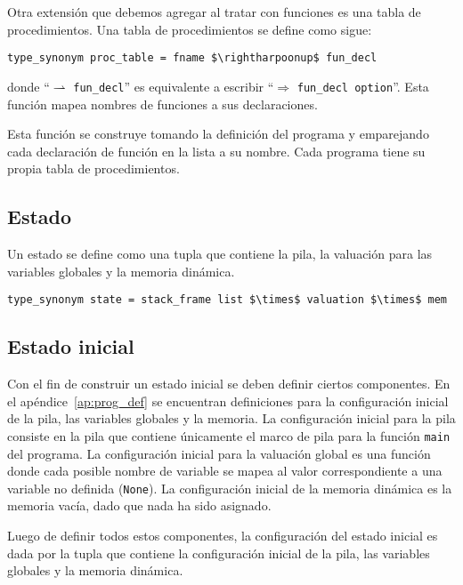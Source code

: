 Otra extensión que debemos agregar al tratar con funciones es una tabla de procedimientos.
Una tabla de procedimientos se define como sigue:

\begin{lstlisting}[mathescape=true, frame=single]
type_synonym proc_table = fname $\rightharpoonup$ fun_decl
\end{lstlisting}

donde ``$\rightharpoonup$ \verb|fun_decl|'' es equivalente a escribir ``$\Rightarrow$ \verb|fun_decl option|''.
Esta función mapea nombres de funciones a sus declaraciones.

Esta función se construye tomando la definición del programa y emparejando cada declaración de función en la lista a su nombre.
Cada programa tiene su propia tabla de procedimientos.


\subsection{Estado}\label{subsection:state}

Un estado se define como una tupla que contiene la pila, la valuación para las variables globales y la memoria dinámica.

\begin{lstlisting}[mathescape=true, frame=single]
type_synonym state = stack_frame list $\times$ valuation $\times$ mem
\end{lstlisting}

\subsection{Estado inicial}\label{subsection:initial_state}

Con el fin de construir un estado inicial se deben definir ciertos componentes.
En el apéndice~\ref{ap:prog_def} se encuentran definiciones para la configuración inicial de la pila, las variables globales y la memoria.
La configuración inicial para la pila consiste en la pila que contiene únicamente el marco de pila para la función \verb|main| del programa.
La configuración inicial para la valuación global es una función donde cada posible nombre de variable se mapea al valor correspondiente a una variable no definida (\verb|None|).
La configuración inicial de la memoria dinámica es la memoria vacía, dado que nada ha sido asignado.

Luego de definir todos estos componentes, la configuración del estado inicial es dada por la tupla que contiene la configuración inicial de la pila, las variables globales y la memoria dinámica.


